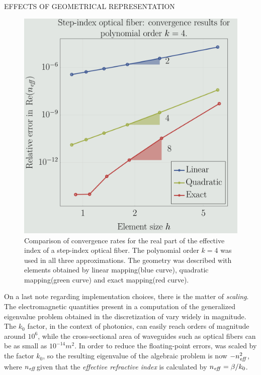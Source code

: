 \documentclass[debug]{beamer} %
\begin{document}
\begin{frame}
\begin{columns}
\begin{column}{0.45\textwidth}
{        \vfill
        \begin{block}{\boxnumber EFFECTS OF GEOMETRICAL REPRESENTATION}
        	\begin{figure}[ht]
            \centering
            \includegraphics[width=0.8\linewidth]{images/convergenceRates_k4_poster.png}
            \caption{Comparison of convergence rates for the real part of the effective index of a step-index optical fiber. The polynomial order $k=4$ was used in all three approximations. The geometry was described with elements obtained by linear mapping(blue curve), quadratic mapping(green curve) and exact mapping(red curve).}
            \label{fig:convergence-step}
        	\end{figure}
        
	        On a last note regarding implementation choices, there is the matter of \emph{scaling}. The electromagnetic quantities present in a computation of the generalized eigenvalue problem obtained in the discretization of  vary widely in magnitude. The $k_0$ factor, in the context of photonics, can easily reach orders of magnitude around $10^6$, while the cross-sectional area of waveguides such as optical fibers can be as small as $10^{-14}m^2$. In order to reduce the floating-point errors,  was scaled by the factor $k_0$, so the resulting eigenvalue of the algebraic problem is now $-n_{\text{\emph{eff}}}^2$, where $n_{\text{\emph{eff}}}$given that the \emph{effective refractive index} is calculated by $n_{\text{\emph{eff}}} = \beta/k_0$.



\end{block}}
\end{column}
\end{columns}
\end{frame}
\end{document}
